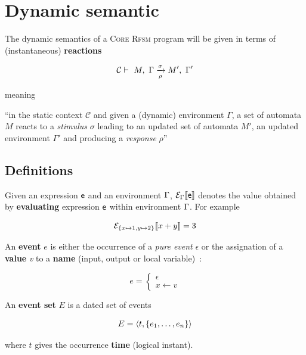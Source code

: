 \section{Dynamic semantic}
\label{sec:dynamic-semantics}

The dynamic semantics of a \textsc{Core Rfsm} program will be given in terms of (instantaneous)
\textbf{reactions}

\begin{eqnarray*}
  \mathcal{C} \vdash\ M,\ \Gamma \xrightarrow[\rho]{\sigma} M',\ \Gamma' 
\end{eqnarray*}

meaning

\begin{center}
``in the static context $\mathcal{C}$ and given a (dynamic) environment $\Gamma$, a set of
automata $M$ reacts to a \emph{stimulus} $\sigma$ leading to an updated set of automata $M'$, an
updated environment $\Gamma'$ and producing a \emph{response} $\rho$''
\end{center}

\subsection*{Definitions}
\label{sec:dynsem-defs}

\step Given an expression $\mathsf{e}$ and an environment $\Gamma$, $\mathcal{E}_{\Gamma}\llbracket \mathsf{e} \rrbracket$ denotes the value obtained by
\textbf{evaluating} expression $\mathsf{e}$ within environment $\Gamma$. For example

$$
\mathcal{E}_{\{x\mapsto 1,y\mapsto 2\}}\llbracket x+y \rrbracket = 3
$$

\medskip \step An \textbf{event} $e$ is either the occurrence of a \emph{pure event}
$\epsilon$ or the assignation of a \textbf{value} \emph{v} to a \textbf{name} (input, output or
local variable)~:

\begin{equation*}
  e = \begin{cases}
             \epsilon \\
             x \gets v
             \end{cases}
\end{equation*}

\medskip
\step An \textbf{event set} $E$ is a dated set of events

\begin{eqnarray*}
  E = \langle t, \{e_1,\ldots,e_n\}\rangle
\end{eqnarray*}

where $t$ gives the occurrence \textbf{time} (logical instant).

